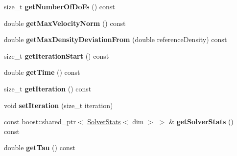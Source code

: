 \begin{DoxyCompactItemize}
\item 
\hypertarget{classnatrium_1_1CFDSolver_a74d459ef4f43d42e04ceb2178bb006f4}{
size\_\-t {\bfseries getNumberOfDoFs} () const }
\label{classnatrium_1_1CFDSolver_a74d459ef4f43d42e04ceb2178bb006f4}

\item 
\hypertarget{classnatrium_1_1CFDSolver_ae9c44bb0f33e2c73ee96fbe100061842}{
double {\bfseries getMaxVelocityNorm} () const }
\label{classnatrium_1_1CFDSolver_ae9c44bb0f33e2c73ee96fbe100061842}

\item 
\hypertarget{classnatrium_1_1CFDSolver_ade641431988a82cb47d88a9d600e1c92}{
double {\bfseries getMaxDensityDeviationFrom} (double referenceDensity) const }
\label{classnatrium_1_1CFDSolver_ade641431988a82cb47d88a9d600e1c92}

\item 
\hypertarget{classnatrium_1_1CFDSolver_a33c4bfd63b8d457a5bc15f0c0da02c38}{
size\_\-t {\bfseries getIterationStart} () const }
\label{classnatrium_1_1CFDSolver_a33c4bfd63b8d457a5bc15f0c0da02c38}

\item 
\hypertarget{classnatrium_1_1CFDSolver_a8e3686b16794c0040bd5cc7cf9fe98d3}{
double {\bfseries getTime} () const }
\label{classnatrium_1_1CFDSolver_a8e3686b16794c0040bd5cc7cf9fe98d3}

\item 
\hypertarget{classnatrium_1_1CFDSolver_a3c0920e02df800abcfb8f82518cab0ca}{
size\_\-t {\bfseries getIteration} () const }
\label{classnatrium_1_1CFDSolver_a3c0920e02df800abcfb8f82518cab0ca}

\item 
\hypertarget{classnatrium_1_1CFDSolver_a97546801de9259206f9611c14ce9ff1d}{
void {\bfseries setIteration} (size\_\-t iteration)}
\label{classnatrium_1_1CFDSolver_a97546801de9259206f9611c14ce9ff1d}

\item 
\hypertarget{classnatrium_1_1CFDSolver_aa0a28a595e850dee1c40bc7ddec9b6ca}{
const boost::shared\_\-ptr$<$ \hyperlink{classnatrium_1_1SolverStats}{SolverStats}$<$ dim $>$ $>$ \& {\bfseries getSolverStats} () const }
\label{classnatrium_1_1CFDSolver_aa0a28a595e850dee1c40bc7ddec9b6ca}

\item 
\hypertarget{classnatrium_1_1CFDSolver_abcce31d3ba9b00e148780b6c855d189b}{
double {\bfseries getTau} () const }
\label{classnatrium_1_1CFDSolver_abcce31d3ba9b00e148780b6c855d189b}


\end{DoxyCompactItemize}

